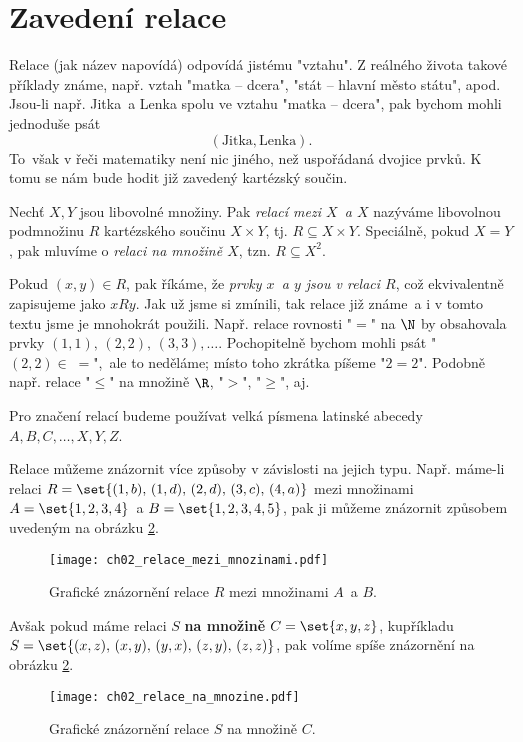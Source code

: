 \section{Zavedení relace}\label{sec:zavedeni_relace}
Relace (jak název napovídá) odpovídá jistému "vztahu". Z reálného života takové příklady známe, např. vztah "matka -- dcera", "stát -- hlavní město státu", apod. Jsou-li např. Jitka~a Lenka spolu ve vztahu "matka -- dcera", pak bychom mohli jednoduše psát
\begin{equation*}
    (\text{Jitka}, \text{Lenka}).
\end{equation*}
To~však v řeči matematiky není nic jiného, než uspořádaná dvojice prvků. K tomu se nám bude hodit již zavedený kartézský součin.
\begin{definition}[Relace]\label{def:relace}
    Nechť $X,Y$ jsou libovolné množiny. Pak \emph{relací mezi $X$~a $X$} nazýváme libovolnou podmnožinu $R$ kartézského součinu $X\times Y$, tj. $R\subseteq X \times Y$. Speciálně, pokud $X=Y$, pak mluvíme o \emph{relaci na množině $X$}, tzn. $R\subseteq X^2$.
\end{definition}
Pokud $(x,y)\in R$, pak říkáme, že \emph{prvky $x$~a $y$ jsou v relaci $R$}, což ekvivalentně zapisujeme jako $xRy$. Jak už jsme si zmínili, tak relace již známe~a i v tomto textu jsme je mnohokrát použili. Např. relace rovnosti "$=$" na $\N$ by obsahovala prvky $(1,1),\,(2,2),\,(3,3),\dots$. Pochopitelně bychom mohli psát "$(2,2)\in\;=$",~ale to neděláme; místo toho zkrátka píšeme "$2=2$". Podobně např. relace "$\leq$" na množině $\R$, "$>$", "$\geq$", aj.
\begin{convention}
    Pro značení relací budeme používat velká písmena latinské abecedy $A,B,C,\dots,X,Y,Z$.
\end{convention}
Relace můžeme znázornit více způsoby v závislosti na jejich typu. Např. máme-li relaci $R=\set{(1,b),\,(1,d),\,(2,d),\,(3,c),\,(4,a)}$ mezi množinami $A=\set{1,2,3,4}$~a $B=\set{1,2,3,4,5}$, pak ji můžeme znázornit způsobem uvedeným na obrázku \ref{fig:relace_mezi_mnozinami}.
\begin{figure}[H]
    \centering
    \texttt{[image: ch02\_relace\_mezi\_mnozinami.pdf]}
    \caption{Grafické znázornění relace $R$ mezi množinami $A$~a $B$.}
    \label{fig:relace_mezi_mnozinami}
\end{figure}
Avšak pokud máme relaci $S$ \textbf{na množině} $C=\set{x,y,z}$, kupříkladu $S=\set{(x,z),\,(x,y),\,(y,x),\,(z,y),\,(z,z)}$, pak volíme spíše znázornění na obrázku \ref{fig:relace_mezi_mnozinami}.
\begin{figure}[H]
    \centering
    \texttt{[image: ch02\_relace\_na\_mnozine.pdf]}
    \caption{Grafické znázornění relace $S$ na množině $C$.}
    \label{fig:relace_mezi_mnozinami}
\end{figure}
